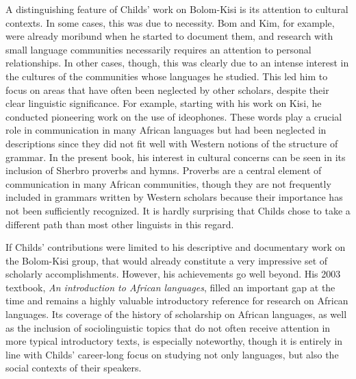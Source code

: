 A distinguishing feature of Childs' work on Bolom-Kisi is its attention to cultural contexts. In some cases, this was due to necessity. Bom and Kim, for example, were already moribund when he started to document them, and research with small language communities necessarily requires an attention to personal relationships. In other cases, though, this was clearly due to an intense interest in the cultures of the communities whose languages he studied. This led him to focus on areas that have often been neglected by other scholars, despite their clear linguistic significance. For example, starting with his work on Kisi, he conducted pioneering work on the use of ideophones. These words play a crucial role in communication in many African languages but had been neglected in descriptions since they did not fit well with Western notions of the structure of grammar. In the present book, his interest in cultural concerns can be seen in its inclusion of Sherbro proverbs and hymns. Proverbs are a central element of communication in many African communities, though they are not frequently included in grammars written by Western scholars because their importance has not been sufficiently recognized. It is hardly surprising that Childs chose to take a different path than most other linguists in this regard.

If Childs' contributions were limited to his descriptive and documentary work on the Bolom-Kisi group, that would already constitute a very impressive set of scholarly accomplishments. However, his achievements go well beyond.  His 2003 textbook, \textit{An introduction to African languages}, filled an important gap at the time and remains a highly valuable introductory reference for research on African languages. Its coverage of the history of scholarship on African languages, as well as the inclusion of sociolinguistic topics that do not often receive attention in more typical introductory texts, is especially noteworthy, though it is entirely in line with Childs' career-long focus on studying not only languages, but also the social contexts of their speakers.

